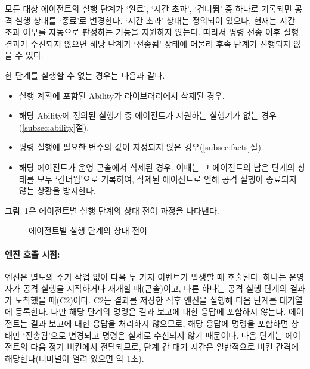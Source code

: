 모든 대상 에이전트의 실행 단계가 `완료', `시간 초과', `건너뜀' 중 하나로 기록되면 공격 실행 상태를 `종료'로 변경한다.
`시간 초과' 상태는 정의되어 있으나, 현재는 시간 초과 여부를 자동으로 판정하는 기능을 지원하지 않는다.
따라서 명령 전송 이후 실행 결과가 수신되지 않으면 해당 단계가 `전송됨' 상태에 머물러 후속 단계가 진행되지 않을 수 있다.

한 단계를 실행할 수 없는 경우는 다음과 같다.

\begin{itemize}
    \item 실행 계획에 포함된 Ability가 라이브러리에서 삭제된 경우.
    \item 해당 Ability에 정의된 실행기 중 에이전트가 지원하는 실행기가 없는 경우(\ref{subsec:ability}절).
    \item 명령 실행에 필요한 변수의 값이 지정되지 않은 경우(\ref{subsec:facts}절).
    \item 해당 에이전트가 운영 콘솔에서 삭제된 경우. 이때는 그 에이전트의 남은 단계의 상태를 모두 `건너뜀'으로 기록하여, 삭제된 에이전트로 인해 공격 실행이 종료되지 않는 상황을 방지한다.
\end{itemize}

그림~\ref{fig:step-states}은 에이전트별 실행 단계의 상태 전이 과정을 나타낸다.

\begin{figure}[H]
\centering
{}
\caption{에이전트별 실행 단계의 상태 전이}
\label{fig:step-states}
\end{figure}

\paragraph{\textbf{엔진 호출 시점:}}
엔진은 별도의 주기 작업 없이 다음 두 가지 이벤트가 발생할 때 호출된다.
하나는 운영자가 공격 실행을 시작하거나 재개할 때(콘솔)이고, 다른 하나는 공격 실행 단계의 결과가 도착했을 때(C2)이다.
C2는 결과를 저장한 직후 엔진을 실행해 다음 단계를 대기열에 등록한다.
다만 해당 단계의 명령은 결과 보고에 대한 응답에 포함하지 않는다. 에이전트는 결과 보고에 대한 응답을 처리하지 않으므로, 해당 응답에 명령을 포함하면 상태만 `전송됨'으로 변경되고 명령은 실제로 수신되지 않기 때문이다.
다음 단계는 에이전트의 다음 정기 비컨에서 전달되므로, 단계 간 대기 시간은 일반적으로 비컨 간격에 해당한다(터미널이 열려 있으면 약 1초).


